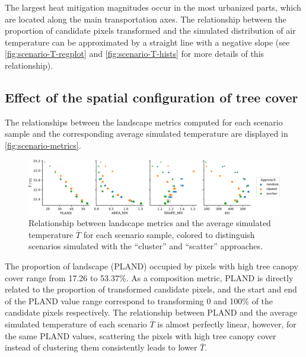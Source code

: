 \documentclass[10pt,letterpaper]{article}
\begin{document}
The largest heat mitigation magnitudes occur in the most urbanized parts, which are located along the main transportation axes.
The relationship between the proportion of candidate pixels transformed and the simulated distribution of air temperature can be approximated by a straight line with a negative slope (see \autoref{fig:scenario-T-regplot} and \autoref{fig:scenario-T-hists} for more details of this relationship).


\subsection*{Effect of the spatial configuration of tree cover}

The relationships between the landscape metrics computed for each scenario sample and the corresponding average simulated temperature are displayed in \autoref{fig:scenario-metrics}.
\begin{figure}
  \begin{adjustwidth}{-.4\textwidth}{0cm}  
    \includegraphics[width=.99\linewidth]{figures/scenario-metrics}
    \caption{\label{fig:scenario-metrics} Relationship between landscape metrics and the average simulated temperature $\overline{T}$ for each scenario sample, colored to distinguish scenarios simulated with the ``cluster'' and ``scatter'' approaches.}    
  \end{adjustwidth}
\end{figure}
The proportion of landscape (PLAND) occupied by pixels with high tree canopy cover range from 17.26 to 53.37\%. As a composition metric, PLAND is directly related to the proportion of transformed candidate pixels, and the start and end of the PLAND value range correspond to transforming 0 and 100\% of the candidate pixels respectively.
The relationship between PLAND and the average simulated temperature of each scenario $\overline{T}$ is almost perfectly linear, however, for the same PLAND values, scattering the pixels with high tree canopy cover instead of clustering them consistently leads to lower $\overline{T}$.
\end{document}
